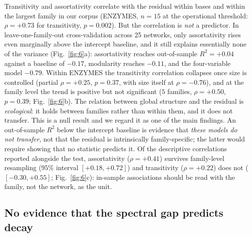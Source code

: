 \documentclass[11pt]{article}
\begin{document}
Transitivity and assortativity correlate with the residual within bases and
within the largest family in our corpus (ENZYMES, $n=15$ at the operational
threshold:
$\rho = +0.73$ for transitivity, $p = 0.002$). But the correlation is
\emph{not} a predictor. In leave-one-family-out cross-validation across 25
networks, only assortativity rises even marginally above the intercept
baseline, and it still explains essentially none of the variance
(Fig.~\ref{fig:6}a): assortativity reaches out-of-sample $R^2 = +0.04$
against a baseline of $-0.17$, modularity reaches $-0.11$, and the
four-variable model $-0.79$. Within ENZYMES the transitivity correlation collapses once
size is controlled (partial $\rho = +0.25$, $p = 0.37$, with size itself at
$\rho = -0.76$), and at the family level the trend is positive but not
significant ($5$ families, $\rho = +0.50$, $p = 0.39$;
Fig.~\ref{fig:6}b). The relation between global structure and the residual is
\emph{ecological}: it holds between families rather than within them, and it
does not transfer. This is a null result and we regard it as one of the main
findings. An out-of-sample $R^2$ below the intercept baseline is evidence that
\emph{these models do not transfer}, not that the residual is intrinsically
family-specific; the latter would require showing that no statistic predicts
it. Of the descriptive correlations reported alongside the test, assortativity
($\rho=+0.41$) survives family-level resampling ($95\%$ interval
$[+0.18,+0.72]$) and transitivity ($\rho=+0.22$) does not
($[-0.30,+0.55]$; Fig.~\ref{fig:6}c): in-sample associations should be read
with the family, not the network, as the unit.

\subsection*{No evidence that the spectral gap predicts decay}
\end{document}
